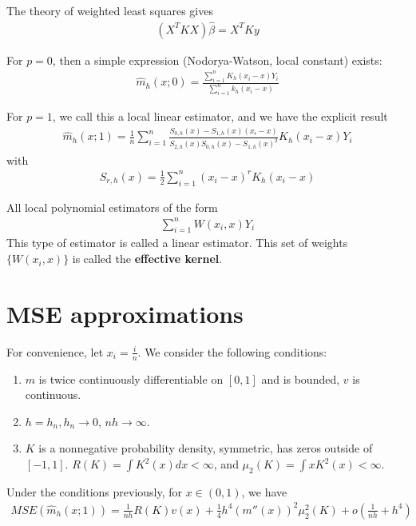 The theory of weighted least squares gives
\begin{align}
  \label{eq:53}
  (X^{T} K X) \hat \beta = X^{T} K y
\end{align}

For $p = 0$, then a simple expression (Nodorya-Watson, local constant)
exists:
\begin{align}
  \label{eq:54}
  \hat m_{h}(x; 0) = \frac{\sum_{i=1}^{n} K_{h}(x_{i} -
    x)Y_{i}}{\sum_{i=1}^{n} k_{h}(x_{i} - x)}
\end{align}


For $p= 1$, we call this a local linear estimator, and we have the
explicit result
\begin{align}
  \label{eq:55}
  \hat m_{h}(x; 1) = \frac{1}{n} \sum_{i=1}^{n} \frac{S_{0, h}(x) -
    S_{1, h}(x)(x_{i} - x)}{S_{2, h}(x) S_{0, h}(x) - S_{1, h}(x)^{2}}
  K_{h}(x_{i} - x) Y_{i}
\end{align}
with
\begin{align}
  \label{eq:56}
  S_{r, h}(x) = \frac{1}{2} \sum_{i=1}^{n} (x_{i} - x)^{r} K_{h}(x_{i}
  - x)
\end{align}

All local polynomial estimators of the form
\begin{align}
  \label{eq:57}
  \sum_{i=1}^{n} W(x_{i}, x) Y_{i}
\end{align}
This type of estimator is called a linear estimator.   This set of
weights $\{ W(x_{i}, x) \}$ is called the \textbf{effective kernel}.

\section{MSE approximations}
\label{sec:mse-approxmiations}

For convenience, let $x_{i} = \frac{i}{n}$.  We consider the following
conditions:

\begin{enumerate}
\item $m$ is twice continuously differentiable on $[0, 1]$ and is bounded, $v$ is continuous.
\item $h = h_{n}, h_{n} \rightarrow 0$, $nh \rightarrow \infty$.
\item $K$ is a nonnegative probability density, symmetric, has zeros
  outside of $[-1, 1]$. $R(K) = \int K^{2}(x) dx < \infty$, and
  $\mu_{2}(K) = \int x K^{2}(x) < \infty$.
\end{enumerate}

\begin{thm}
  \label{defn:nonparametric_regression:1}
  Under the conditions previously, for $x \in (0, 1)$, we have
  \begin{align}
    \label{eq:58}
    MSE(\hat m_{h}(x; 1)) = \frac{1}{nh} R(K) v(x) + \frac{1}{4} h^{4}
    (m''(x))^{2} \mu_{2}^{2}(K) + o(\frac{1}{nh} + h^{4})
  \end{align}
\end{thm}

